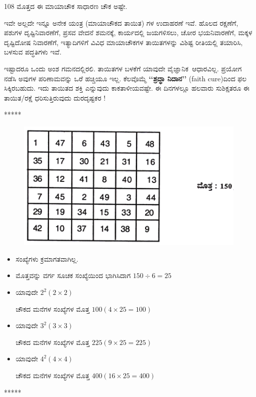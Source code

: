108 ಮೊತ್ತದ ಈ ಮಾಯಾಚೌಕ ಸಾಧಾರಣ ಚೌಕ ಅಷ್ಟೇ.

ಇವೇ ಅಲ್ಲದೇ ಇನ್ನೂ ಅನೇಕ ಯಂತ್ರ (ಮಾಯಾಚೌಕದ ತಾಯಿತ) ಗಳ ಉದಾಹರಣೆ ಇವೆ. ಹೊಲದ ರಕ್ಷಣೆಗೆ, ಪಶುಗಳ ದೃಷ್ಟಿನಿವಾರಣೆಗೆ, ಪ್ರಸವ ವೇದನೆ ಶಮನಕ್ಕೆ, ಕಾರ್ಯದಲ್ಲಿ  ಜಯಗಳಿಸಲು, ಚೋರ ಭಯನಿವಾರಣೆಗೆ, ಮಕ್ಕಳ ದೃಷ್ಟಿದೋಷ ನಿವಾರಣೆಗೆ, ಇತ್ಯಾದಿ\-ಗಳಿಗೆ ವಿವಿಧ ಮಾಯಾಚೌಕಗಳ ತಾಯಿತಗಳನ್ನು ವಿಶಿಷ್ಟ ರೀತಿಯಲ್ಲಿ ತಯಾರಿಸಿ, ಬಳಸುವ ಪದ್ಧತಿ\-ಗಳು ಇವೆ.

ಇಷ್ಟಾದರೂ ಒಂದು ಅಂಶ ಗಮನದಲ್ಲಿರಲಿ. ತಾಯಿತಗಳ ಬಳಕೆಗೆ ಯಾವುದೇ \hbox{ವೈಜ್ಞಾನಿಕ ಆಧಾರವಿಲ್ಲ.} ಪ್ರಯೋಗ ನಡೆಸಿ ಅವುಗಳ ಪರಿಣಾಮವನ್ನು ಒರೆ ಹಚ್ಚಿಯೂ ಇಲ್ಲ. ಕೆಲವೊಮ್ಮೆ \textbf{‘‘ಶ್ರದ್ಧಾ ನಿದಾನ’’} (faith cure)ದಿಂದ ಫಲ ಸಿಕ್ಕಿರಬಹುದು. ಇದು ತಾಯಿತದ ಶಕ್ತಿ ಎನ್ನುವುದು ಕಾಕತಾಳೀಯವಷ್ಟೇ. ಈ ದಿನಗಳಲ್ಲೂ ಹಲವಾರು ಸುಶಿಕ್ಷತರೂ ಈ ತಾಯಿತ/ರಕ್ಷೆ ಧರಿಸುತ್ತಿರುವುದು ದುರದೃಷ್ಟಕರ !
\begin{center}
*****
\end{center}

\begin{figure}[H]
\includegraphics{src/figures/chap11/fig11-5.jpg}
\end{figure}
\begin{itemize}
	\item ಸಂಖ್ಯೆಗಳು ಕ್ರಮಾಗತವಾಗಿಲ್ಲ.\smallskip
	\item ಮೊತ್ತವನ್ನು ವರ್ಗ ಸೂಚಕ ಸಂಖ್ಯೆಯಿಂದ ಭಾಗಿಸಿದಾಗ $150 \div 6  = 25$\smallskip
	\item ಯಾವುದೇ $2^2 (2 \times 2)$ 
	
	ಚೌಕದ ಮನೆಗಳ ಸಂಖ್ಯೆಗಳ ಮೊತ್ತ $100 (4 \times 25 = 100)$\smallskip
	\item ಯಾವುದೇ $3^2 (3 \times 3)$ 
	
	ಚೌಕದ ಮನೆಗಳ ಸಂಖ್ಯೆಗಳ ಮೊತ್ತ $225 (9 \times 25 = 225)$\smallskip
	\item ಯಾವುದೇ $4^2 (4 \times 4)$ 
	
	ಚೌಕದ ಮನೆಗಳ ಸಂಖ್ಯೆಗಳ ಮೊತ್ತ $400 (16 \times 25 = 400)$\smallskip
\end{itemize}
\begin{center}
*****
\end{center}
